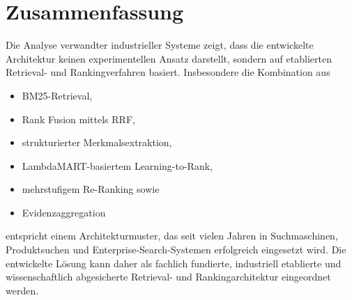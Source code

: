 \section{Zusammenfassung}

Die Analyse verwandter industrieller Systeme zeigt, dass die entwickelte Architektur keinen experimentellen Ansatz darstellt, sondern auf etablierten Retrieval- und Rankingverfahren basiert.
Insbesondere die Kombination aus

\begin{itemize}
  \item BM25-Retrieval,
  \item Rank Fusion mittels RRF,
  \item strukturierter Merkmalsextraktion,
  \item LambdaMART-basiertem Learning-to-Rank,
  \item mehrstufigem Re-Ranking sowie
  \item Evidenzaggregation
\end{itemize}

entspricht einem Architekturmuster, das seit vielen Jahren in Suchmaschinen, Produktsuchen und Enterprise-Search-Systemen erfolgreich eingesetzt wird.
Die entwickelte Lösung kann daher als fachlich fundierte, industriell etablierte und wissenschaftlich abgesicherte Retrieval- und Rankingarchitektur eingeordnet werden.
